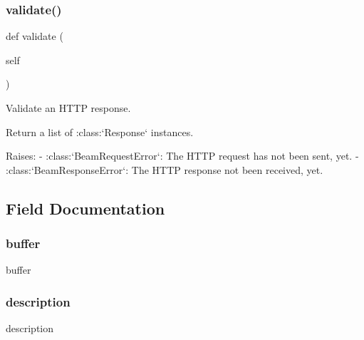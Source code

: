 \subsubsection{\texorpdfstring{validate()}{validate()}}
{\footnotesize\ttfamily def validate (\begin{DoxyParamCaption}\item[{}]{self }\end{DoxyParamCaption})}

\begin{DoxyVerb}Validate an HTTP response.

Return a list of :class:`Response` instances.

Raises:
    - :class:`BeamRequestError`: The HTTP request has not been
      sent, yet.
    - :class:`BeamResponseError`: The HTTP response not been
      received, yet.
\end{DoxyVerb}
 

\subsection{Field Documentation}
\mbox{\label{classpewpewlaz0rt4nk_1_1_beam_a38acb51b2a63fccbafac9c0afca0c1b9}} 
\subsubsection{\texorpdfstring{buffer}{buffer}}
{\footnotesize\ttfamily buffer}

\mbox{\label{classpewpewlaz0rt4nk_1_1_beam_a2661f439a4a94ffdcd5e47ae1da0bb1d}} 
\subsubsection{\texorpdfstring{description}{description}}
{\footnotesize\ttfamily description}

\mbox{\label{classpewpewlaz0rt4nk_1_1_beam_a832ddc04754e8a43d4f3c6165b1294a7}} 
